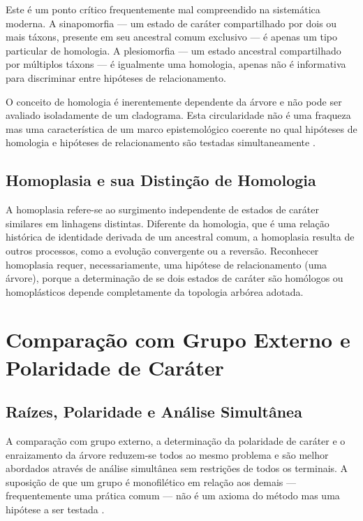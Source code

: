 Este é um ponto crítico frequentemente mal compreendido na sistemática moderna. A sinapomorfia --- um estado de caráter compartilhado por dois ou mais táxons, presente em seu ancestral comum exclusivo --- é apenas um tipo particular de homologia. A plesiomorfia --- um estado ancestral compartilhado por múltiplos táxons --- é igualmente uma homologia, apenas não é informativa para discriminar entre hipóteses de relacionamento.

O conceito de homologia é inerentemente dependente da árvore e não pode ser avaliado isoladamente de um cladograma. Esta circularidade não é uma fraqueza mas uma característica de um marco epistemológico coerente no qual hipóteses de homologia e hipóteses de relacionamento são testadas simultaneamente \parencite{nixon1993}.

\subsection{Homoplasia e sua Distinção de Homologia}

A homoplasia refere-se ao surgimento independente de estados de caráter similares em linhagens distintas. Diferente da homologia, que é uma relação histórica de identidade derivada de um ancestral comum, a homoplasia resulta de outros processos, como a evolução convergente ou a reversão. Reconhecer homoplasia requer, necessariamente, uma hipótese de relacionamento (uma árvore), porque a determinação de se dois estados de caráter são homólogos ou homoplásticos depende completamente da topologia arbórea adotada.

\section{Comparação com Grupo Externo e Polaridade de Caráter}

\subsection{Raízes, Polaridade e Análise Simultânea}

A comparação com grupo externo, a determinação da polaridade de caráter e o enraizamento da árvore reduzem-se todos ao mesmo problema e são melhor abordados através de análise simultânea sem restrições de todos os terminais. A suposição de que um grupo é monofilético em relação aos demais --- frequentemente uma prática comum --- não é um axioma do método mas uma hipótese a ser testada \parencite{nixon1993}.

